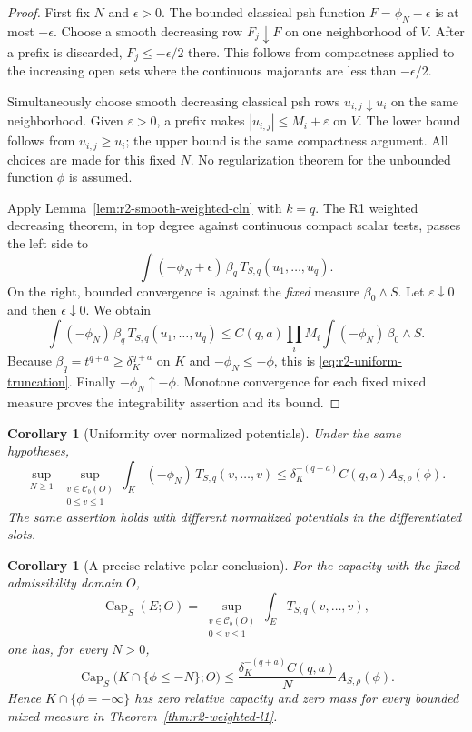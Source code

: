 \documentclass[11pt,a4paper]{article}
\numberwithin{equation}{section}
\newtheorem{corollary}[theorem]{Corollary}
\theoremstyle{definition}
\theoremstyle{remark}
\newcommand{\Cb}{\mathcal C_b}
\begin{document}
\begin{proof}
First fix $N$ and $\epsilon>0$. The bounded classical psh function
$F=\phi_N-\epsilon$ is at most $-\epsilon$.
Choose a smooth decreasing row $F_j\downarrow F$ on one
neighborhood of $\overline V$. After a prefix is discarded,
$F_j\leq-\epsilon/2$ there. This follows from compactness applied
to the increasing open sets where the continuous majorants are
less than $-\epsilon/2$.

Simultaneously choose smooth decreasing classical psh rows
$u_{i,j}\downarrow u_i$ on the same neighborhood. Given
$\varepsilon>0$, a prefix makes $|u_{i,j}|\leq M_i+\varepsilon$
on $\overline V$. The lower bound follows from $u_{i,j}\geq u_i$;
the upper bound is the same compactness argument. All choices are
made for this fixed $N$. No regularization theorem for the
unbounded function $\phi$ is assumed.

Apply Lemma~\ref{lem:r2-smooth-weighted-cln} with $k=q$.
The R1 weighted decreasing theorem, in top degree against
continuous compact scalar tests, passes the left side to
\[
 \int(-\phi_N+\epsilon)\,\beta_q\,
                          T_{S,q}(u_1,\ldots,u_q).
\]
On the right, bounded convergence is against the \emph{fixed}
measure $\beta_0\wedge S$. Let $\varepsilon\downarrow0$ and
then $\epsilon\downarrow0$. We obtain
\[
 \int(-\phi_N)\,\beta_q\,
                          T_{S,q}(u_1,\ldots,u_q)
 \leq C(q,a)\prod_iM_i\int(-\phi_N)\,\beta_0\wedge S.
\]
Because $\beta_q=t^{q+a}\geq\delta_K^{q+a}$ on $K$ and
$-\phi_N\leq-\phi$, this is
\eqref{eq:r2-uniform-truncation}. Finally $-\phi_N\uparrow-\phi$.
Monotone convergence for each fixed mixed measure proves the
integrability assertion and its bound.
\end{proof}

\begin{corollary}[Uniformity over normalized potentials]
\label{cor:r2-normalized-witness}
Under the same hypotheses,
\[
 \sup_{N\geq1}\ \sup_{\substack{v\in\Cb(O)\\0\leq v\leq1}}
 \int_K(-\phi_N)\,T_{S,q}(v,\ldots,v)
 \leq \delta_K^{-(q+a)}C(q,a)A_{S,\rho}(\phi).
\]
The same assertion holds with different normalized potentials in
the differentiated slots.
\end{corollary}

\begin{corollary}[A precise relative polar conclusion]
\label{cor:r2-relative-polar}
For the capacity with the \emph{fixed admissibility domain} $O$,
\[
 \operatorname{Cap}_{S}(E;O)
   =\sup_{\substack{v\in\Cb(O)\\0\leq v\leq1}}
          \int_E T_{S,q}(v,\ldots,v),
\]
one has, for every $N>0$,
\[
 \operatorname{Cap}_{S}\bigl(K\cap\{\phi\leq-N\};O\bigr)
 \leq \frac{\delta_K^{-(q+a)}C(q,a)}{N}
                   A_{S,\rho}(\phi).
\]
Hence $K\cap\{\phi=-\infty\}$ has zero relative capacity and
zero mass for every bounded mixed measure in
Theorem~\ref{thm:r2-weighted-l1}.
\end{corollary}
\end{document}
